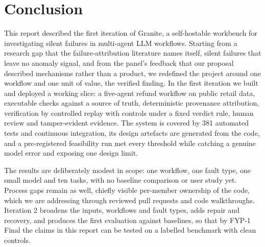 \chapter{Conclusion}

This report described the first iteration of Granite, a self-hostable workbench for investigating silent failures in multi-agent LLM workflows. Starting from a research gap that the failure-attribution literature names itself, silent failures that leave no anomaly signal, and from the panel's feedback that our proposal described mechanisms rather than a product, we redefined the project around one workflow and one unit of value, the verified finding. In the first iteration we built and deployed a working slice: a five-agent refund workflow on public retail data, executable checks against a source of truth, deterministic provenance attribution, verification by controlled replay with controls under a fixed verdict rule, human review and tamper-evident evidence. The system is covered by 381 automated tests and continuous integration, its design artefacts are generated from the code, and a pre-registered feasibility run met every threshold while catching a genuine model error and exposing one design limit.

The results are deliberately modest in scope: one workflow, one fault type, one small model and ten tasks, with no baseline comparison or user study yet. Process gaps remain as well, chiefly visible per-member ownership of the code, which we are addressing through reviewed pull requests and code walkthroughs. Iteration 2 broadens the inputs, workflows and fault types, adds repair and recovery, and produces the first evaluation against baselines, so that by FYP-1 Final the claims in this report can be tested on a labelled benchmark with clean controls.
